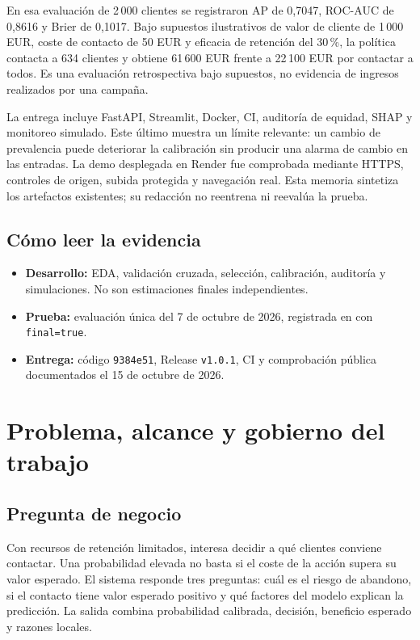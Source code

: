 \documentclass[11pt,a4paper,oneside]{report}
\newcommand{\versioncodigo}{9384e51}
\begin{document}
En esa evaluación de 2\,000 clientes se registraron AP de 0,7047, ROC-AUC de
0,8616 y Brier de 0,1017. Bajo supuestos ilustrativos de valor de cliente de
1\,000 EUR, coste de contacto de 50 EUR y eficacia de retención del 30\,\%,
la política contacta a 634 clientes y obtiene 61\,600 EUR frente a 22\,100 EUR
por contactar a todos. Es una evaluación retrospectiva bajo supuestos, no
evidencia de ingresos realizados por una campaña.

La entrega incluye FastAPI, Streamlit, Docker, CI, auditoría de equidad, SHAP
y monitoreo simulado. Este último muestra un límite relevante: un cambio de
prevalencia puede deteriorar la calibración sin producir una alarma de cambio
en las entradas. La demo desplegada en Render fue comprobada mediante HTTPS,
controles de origen, subida protegida y navegación real. Esta memoria sintetiza
los artefactos existentes; su redacción no reentrena ni reevalúa la prueba.

\section*{Cómo leer la evidencia}
\begin{itemize}
\item \textbf{Desarrollo:} EDA, validación cruzada, selección, calibración,
  auditoría y simulaciones. No son estimaciones finales independientes.
\item \textbf{Prueba:} evaluación única del 7 de octubre de 2026, registrada
  en  con \texttt{final=true}.
\item \textbf{Entrega:} código \texttt{\versioncodigo}, Release \texttt{v1.0.1},
  CI y comprobación pública documentados el 15 de octubre de 2026.
\end{itemize}
\tableofcontents
\listoftables
\listoffigures
\clearpage
{}

\chapter{Problema, alcance y gobierno del trabajo}
\section{Pregunta de negocio}
Con recursos de retención limitados, interesa decidir a qué clientes conviene
contactar. Una probabilidad elevada no basta si el coste de la acción supera
su valor esperado. El sistema responde tres preguntas: cuál es el riesgo de
abandono, si el contacto tiene valor esperado positivo y qué factores del modelo
explican la predicción. La salida combina probabilidad calibrada, decisión,
beneficio esperado y razones locales.
\end{document}

